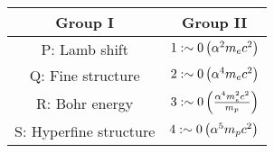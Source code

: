 \begin{tabular}{|c|c|}
\hline
Group I & Group II \\ \hline
P: Lamb shift & $1: \sim 0 \left(\alpha^2 m_e c^2\right)$ \\ \hline
Q: Fine structure & $2: \sim 0 \left(\alpha^4 m_e c^2\right)$ \\ \hline
R: Bohr energy & $3: \sim 0 \left(\frac{\alpha^4 m_e^2 c^2}{ m_p}\right)$ \\ \hline
S: Hyperfine structure & $4: \sim 0 \left(\alpha^5 m_p c^2\right)$ \\ \hline
\end{tabular}

